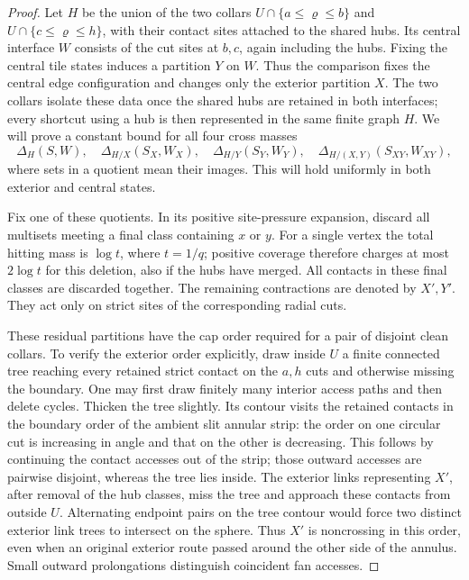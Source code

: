 \begin{proof}
Let $H$ be the union of the two collars
$U\cap\{a\le\varrho\le b\}$ and
$U\cap\{c\le\varrho\le h\}$, with their contact sites attached to the
shared hubs.  Its central interface $W$ consists of the cut sites at
$b,c$, again including the hubs.  Fixing the central tile states induces
a partition $Y$ on $W$.  Thus the comparison fixes the central edge
configuration and changes only the exterior partition $X$.  The two
collars isolate these data once the shared hubs are retained in both
interfaces; every shortcut using a hub is then represented in the
same finite graph $H$.  We will prove a constant bound for all four
cross masses
\begin{equation}\label{eq:disk-join-four-masses}
 \Delta_H(S,W),\quad
 \Delta_{H/X}(S_X,W_X),\quad
 \Delta_{H/Y}(S_Y,W_Y),\quad
 \Delta_{H/(X,Y)}(S_{XY},W_{XY}),
\end{equation}
where sets in a quotient mean their images.  This will hold uniformly
in both exterior and central states.

Fix one of these quotients.  In its positive site-pressure expansion,
discard all multisets meeting a final class containing $x$ or $y$.
For a single vertex the total hitting mass is $\log t$, where $t=1/q$;
positive coverage therefore charges at most $2\log t$ for this deletion,
also if the hubs have merged.  All contacts in these final classes are
discarded together.  The remaining contractions are denoted by $X',Y'$.
They act only on strict sites of the corresponding radial cuts.

These residual partitions have the cap order required for a pair of
disjoint clean collars.  To verify the exterior order explicitly, draw
inside $U$ a finite connected tree reaching every retained strict
contact on the $a,h$ cuts and otherwise missing the boundary.  One may
first draw finitely many interior access paths and then delete cycles.
Thicken the tree slightly.  Its contour visits the retained contacts
in the boundary order of the ambient slit annular strip: the order on
one circular cut is increasing in angle and that on the other is
decreasing.  This follows by continuing the contact accesses out of
the strip; those outward accesses are pairwise disjoint, whereas the
tree lies inside.  The exterior links representing $X'$, after removal
of the hub classes, miss the tree and approach these contacts from
outside $U$.  Alternating endpoint pairs on the tree contour would
force two distinct exterior link trees to intersect on the sphere.
Thus $X'$ is noncrossing in this order, even when an original exterior
route passed around the other side of the annulus.  Small outward
prolongations distinguish coincident fan accesses.


\end{proof}
